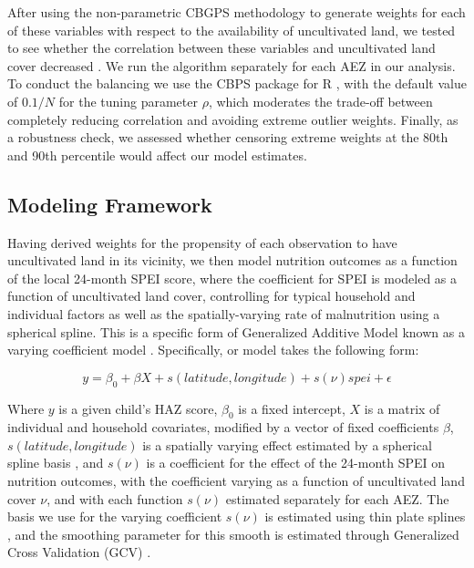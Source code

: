 \documentclass{article}
\begin{document}
After using the non-parametric CBGPS methodology to generate weights for each of these variables with respect to the availability of uncultivated land, we tested to see whether the correlation between these variables and uncultivated land cover decreased \cite{Fong2018}.  We run the algorithm separately for each AEZ in our analysis.  To conduct the balancing we use the CBPS package for R \cite{Fong2018a}, with the default value of $0.1/N$ for the tuning parameter $\rho$, which moderates the trade-off between completely reducing correlation and avoiding extreme outlier weights.  Finally, as a robustness check, we assessed whether censoring extreme weights at the 80th and 90th percentile would affect our model estimates.

\subsection{Modeling Framework}
Having derived weights for the propensity of each observation to have uncultivated land in its vicinity, we then model nutrition outcomes as a function of the local 24-month SPEI score, where the coefficient for SPEI is modeled as a function of uncultivated land cover, controlling for typical household and individual factors as well as the spatially-varying rate of malnutrition using a spherical spline.  This is a specific form of Generalized Additive Model \cite{Hastie1986} known as a varying coefficient model \cite{Wood2017}.  Specifically, or model takes the following form:

\begin{equation}
 y = \beta_0 + \beta X + s(latitude, longitude) + s(\nu) spei + \epsilon \label{eqn:GAM}
\end{equation}

Where $y$ is a given child's HAZ score, $\beta_0$ is a fixed intercept, $X$ is a matrix of individual and household covariates, modified by a vector of fixed coefficients $\beta$, $s(latitude, longitude)$ is a spatially varying effect estimated by a spherical spline basis \cite{Wahba1982}, and $s(\nu)$ is a coefficient for the effect of the 24-month SPEI on nutrition outcomes, with the coefficient varying as a function of uncultivated land cover $\nu$, and with each function $s(\nu)$ estimated separately for each AEZ.  The basis we use for the varying coefficient $s(\nu)$ is estimated using thin plate splines \cite{Duchon1977}, and the smoothing parameter for this smooth is estimated through Generalized Cross Validation (GCV) \cite{Wood2017}.
\end{document}

